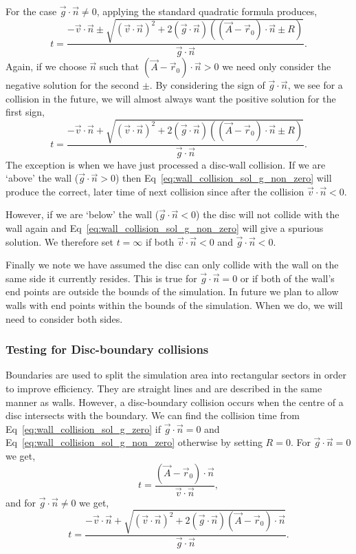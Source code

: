 \documentclass{article}
\begin{document}
For the case $\vec{g} \cdot \vec{n} \neq 0$, applying the standard quadratic formula produces, 
\begin{equation}
    t
    =
    \frac{ - \vec{v} \cdot \vec{n} \pm \sqrt{ (\vec{v} \cdot \vec{n})^2 + 2(\vec{g} \cdot \vec{n})((\vec{A} - \vec{r}_0) \cdot \vec{n} \pm R)}}{\vec{g} \cdot \vec{n}}.
\end{equation}
Again, if we choose $\vec{n}$ such that $(\vec{A} - \vec{r}_0) \cdot \vec{n} > 0$ we need only consider the negative solution for the second $\pm$. By considering the sign of $\vec{g} \cdot \vec{n}$, we see for a collision in the future, we will almost always want the positive solution for the first sign,
\begin{equation}
\label{eq:wall_collision_sol_g_non_zero}
    t
    =
    \frac{ - \vec{v} \cdot \vec{n} + \sqrt{ (\vec{v} \cdot \vec{n})^2 + 2(\vec{g} \cdot \vec{n})((\vec{A} - \vec{r}_0) \cdot \vec{n} \pm R)}}{\vec{g} \cdot \vec{n}}.
\end{equation}
The exception is when we have just processed a disc-wall collision. If we are `above' the wall ($\vec{g} \cdot \vec{n} > 0$) then Eq~\ref{eq:wall_collision_sol_g_non_zero} will produce the correct, later time of next collision since after the collision $\vec{v} \cdot \vec{n} < 0$.

However, if we are `below' the wall ($\vec{g} \cdot \vec{n} < 0$) the disc will not collide with the wall again and Eq~\ref{eq:wall_collision_sol_g_non_zero} will give a spurious solution. We therefore set $t = \infty$ if both $\vec{v} \cdot \vec{n} < 0$ and $\vec{g} \cdot \vec{n} < 0$.

Finally we note we have assumed the disc can only collide with the wall on the same side it currently resides. This is true for $\vec{g} \cdot \vec{n} = 0$ or if both of the wall's end points are outside the bounds of the simulation. In future we plan to allow walls with end points within the bounds of the simulation. When we do, we will need to consider both sides.

\subsubsection{Testing for Disc-boundary collisions}
Boundaries are used to split the simulation area into rectangular sectors in order to improve efficiency. They are straight lines and are described in the same manner as walls. However, a disc-boundary collision occurs when the centre of a disc intersects with the boundary. We can find the collision time from Eq~\ref{eq:wall_collision_sol_g_zero} if $\vec{g} \cdot \vec{n} = 0$ and Eq~\ref{eq:wall_collision_sol_g_non_zero} otherwise by setting $R = 0$. For $\vec{g} \cdot \vec{n} = 0$ we get,
\begin{equation}
    t
    =
    \frac{(\vec{A} - \vec{r}_0) \cdot \vec{n}}{\vec{v} \cdot \vec{n}},
\end{equation}
and for $\vec{g} \cdot \vec{n} \neq 0$ we get,
\begin{equation}
\label{eq:disc_boundary_g_not_zero}
    t
    =
    \frac{ - \vec{v} \cdot \vec{n} + \sqrt{ (\vec{v} \cdot \vec{n})^2 + 2(\vec{g} \cdot \vec{n})(\vec{A} - \vec{r}_0) \cdot \vec{n}}}{\vec{g} \cdot \vec{n}}.
\end{equation}
\end{document}
